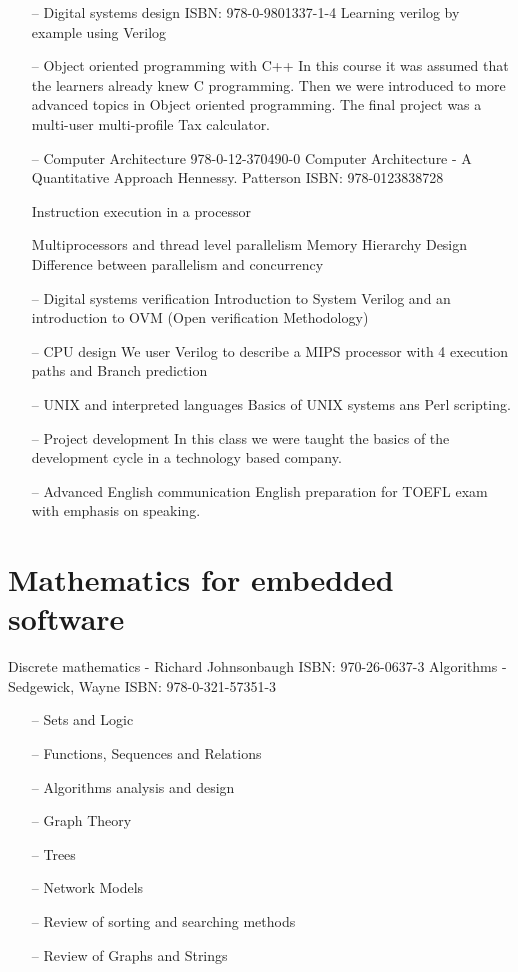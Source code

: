 \documentclass{article}
\begin{document}
    \begin{itemize}
     \setlength\itemsep{0pt}
        \item[--] Digital systems design
            ISBN: 978-0-9801337-1-4
            Learning verilog by example using Verilog
        \item[--] Object oriented programming with C++
            In this course it was assumed that the learners already knew C programming.
            Then we were introduced to more advanced topics in Object oriented programming.
            The final project was a multi-user multi-profile Tax calculator.
        \item[--] Computer Architecture
            978-0-12-370490-0 
            Computer Architecture - A Quantitative Approach
            Hennessy. Patterson ISBN: 978-0123838728 
            
            Instruction execution in a processor
            
            Multiprocessors and thread level parallelism
            Memory Hierarchy Design
            Difference between parallelism and concurrency
            
        \item[--] Digital systems verification
            Introduction to System Verilog and an introduction to OVM (Open verification Methodology)
        \item[--] CPU design
            We user Verilog to describe a MIPS processor with 4 execution paths and Branch prediction
        \item[--] UNIX and interpreted languages
            Basics of UNIX systems ans Perl scripting.
        \item[--] Project development
            In this class we were taught the basics of the development cycle in a technology based company.
        \item[--] Advanced English communication
            English preparation for TOEFL exam with emphasis on speaking.
    \end{itemize}


\section{Mathematics for embedded software}
    Discrete mathematics - Richard Johnsonbaugh ISBN: 970-26-0637-3
    Algorithms - Sedgewick, Wayne ISBN: 978-0-321-57351-3
    \begin{itemize}
     \setlength\itemsep{0pt}
        \item[--] Sets and Logic
        \item[--] Functions, Sequences and Relations
        \item[--] Algorithms analysis and design
        \item[--] Graph Theory
        \item[--] Trees
        \item[--] Network Models
        \item[--] Review of sorting and searching methods
        \item[--] Review of Graphs and Strings
    \end{itemize}
\end{document}
